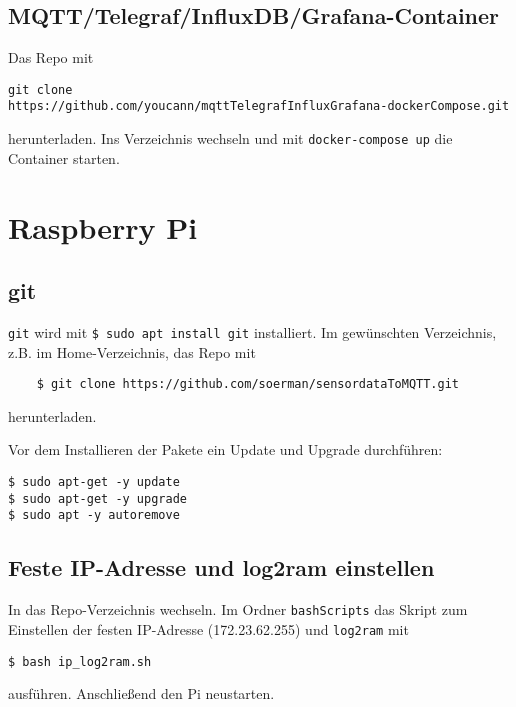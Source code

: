 \subsection{MQTT/Telegraf/InfluxDB/Grafana-Container}
Das Repo mit 
\begin{verbatim}
git clone 
https://github.com/youcann/mqttTelegrafInfluxGrafana-dockerCompose.git
\end{verbatim}
herunterladen. Ins Verzeichnis wechseln und mit \verb|docker-compose up| die Container starten.

\newpage

\section{Raspberry Pi}

\subsection{git}
\texttt{git} wird mit \verb|$ sudo apt install git| installiert.\newline
Im gewünschten Verzeichnis, z.B. im Home-Verzeichnis, das Repo mit 
\begin{verbatim}
	$ git clone https://github.com/soerman/sensordataToMQTT.git
\end{verbatim}
herunterladen. 

Vor dem Installieren der Pakete ein Update und Upgrade durchführen:
\begin{verbatim}
$ sudo apt-get -y update 
$ sudo apt-get -y upgrade
$ sudo apt -y autoremove
\end{verbatim}

\subsection{Feste IP-Adresse und log2ram einstellen}
In das Repo-Verzeichnis wechseln. Im Ordner \verb|bashScripts| das Skript zum Einstellen der festen IP-Adresse (172.23.62.255) und \texttt{log2ram} mit 
\begin{verbatim}
$ bash ip_log2ram.sh
\end{verbatim}
ausführen. Anschließend den Pi neustarten.




